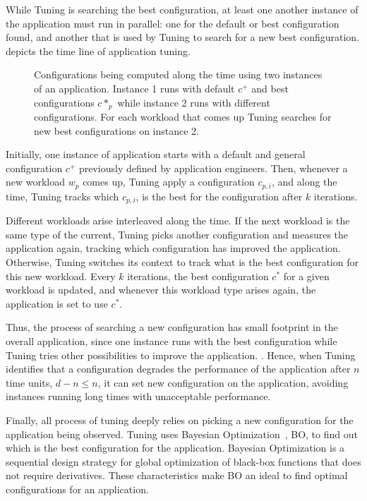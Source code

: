 While Tuning is searching the best configuration, at least one another instance of
the application must run in parallel: one for the default or best configuration
found, and another that is used by Tuning to search for a new best
configuration.  depicts the time line of
application tuning.

\begin{figure*}[htp]
  \centering
  \def\svcwidth{\textwidth}
  \scalebox{1.0}{}
  \caption{Configurations being computed along the time using two instances of an
  application. Instance 1 runs with default $c^+$ and best configurations $c*_p$
  while instance 2 runs with different configurations. For each workload that
  comes up Tuning searches for new best configurations on instance 2.}
  \label{fig:computing-configurations}
\end{figure*}

Initially, one instance of application starts with a default and general
configuration $c^+$ previously defined by application engineers. Then, whenever
a new workload $w_p$ comes up, Tuning apply a configuration $c_{p,i}$, and along
the time, Tuning tracks which $c_{p,i}$, is the best for the configuration after
$k$ iterations.

Different workloads arise interleaved along the time. If the next workload is
the same type of the current, Tuning picks another configuration and measures
the application again, tracking which configuration has improved the
application. Otherwise, Tuning switches its context to track what is the best
configuration for this new workload. Every $k$ iterations, the best
configuration $c^*$ for a given workload is updated, and whenever this workload
type arises again, the application is set to use $c^*$.

Thus, the process of searching a new configuration has small footprint in the
overall application, since one instance runs with the best configuration while
Tuning tries other possibilities to improve the application. . Hence,
when Tuning identifies that a configuration degrades the performance of the
application after $n$ time units, $d - n \le n$, it can set new configuration on
the application, avoiding instances running long times with unacceptable
performance.

Finally, all process of tuning deeply relies on picking a new configuration for
the application being observed. Tuning uses Bayesian Optimization~\cite{?}, BO,
to find out which is the best configuration for the application. Bayesian
Optimization is a sequential design strategy for global optimization of
black-box functions that does not require derivatives. These characteristics
make BO an ideal to find optimal configurations for an application.

